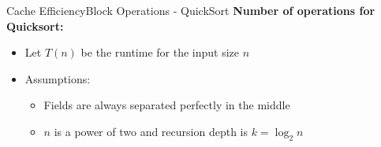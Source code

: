 

\begin{frame}{Cache Efficiency}{Block Operations - QuickSort}
  \textbf{Number of operations for Quicksort:}
   \vspace{1em}
  \begin{itemize}
  \item<2->Let {\color{Mittel-Blau}$T(n)$} be the runtime for the
    {\color{Mittel-Blau}input size $n$}
     \vspace{1em}
  \item<3->Assumptions:
     \vspace{1em}
    \begin{itemize}
    \item<4->
      Fields are always separated perfectly in the middle
      \vspace{1em}
    \item<5->
      {\color{Mittel-Blau}$n$} is a power of two and recursion depth is {\color{Mittel-Blau}$k = \log_2 n$}
    \end{itemize}
  \end{itemize}
\end{frame}


